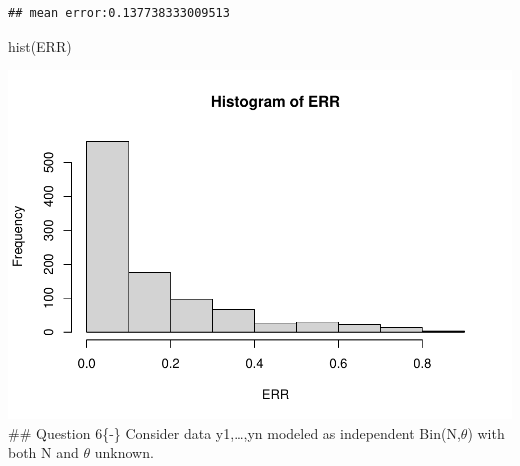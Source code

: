 \documentclass[
]{book}
\newenvironment{Shaded}{\begin{snugshade}}{\end{snugshade}}
\newcommand{\FunctionTok}[1]{\textcolor[rgb]{0.00,0.00,0.00}{#1}}
\newcommand{\NormalTok}[1]{#1}
\theoremstyle{definition}
\theoremstyle{definition}
\theoremstyle{definition}
\theoremstyle{definition}
\theoremstyle{remark}
\begin{document}
\begin{verbatim}
## mean error:0.137738333009513
\end{verbatim}

\begin{Shaded}
\begin{Highlighting}[]
 \FunctionTok{hist}\NormalTok{(ERR)}
\end{Highlighting}
\end{Shaded}

\includegraphics{_main_files/figure-latex/unnamed-chunk-42-1.pdf}
\#\# Question 6\{-\}
Consider data y1,\ldots,yn modeled as independent Bin(N,\(\theta\)) with both N and \(\theta\) unknown.
\end{document}
